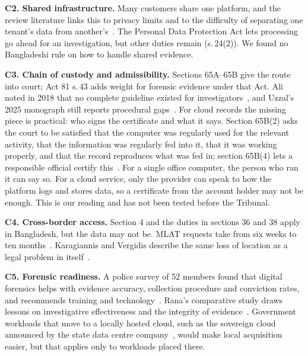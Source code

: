 \documentclass[conference]{IEEEtran}
\begin{document}
\textbf{C2. Shared infrastructure.} Many customers share one platform, and the review literature links this to privacy limits and to the difficulty of separating one tenant's data from another's~\cite{alshabibi,alenezi}. The Personal Data Protection Act lets processing go ahead for an investigation, but other duties remain (s.\,24(2)). We found no Bangladeshi rule on how to handle shared evidence.

\textbf{C3. Chain of custody and admissibility.} Sections 65A--65B give the route into court; Act 81 s.\,43 adds weight for forensic evidence under that Act. Ali noted in 2018 that no complete guideline existed for investigators~\cite{ali}, and Uzzal's 2025 monograph still reports procedural gaps~\cite{uzzal}. For cloud records the missing piece is practical: who signs the certificate and what it says. Section 65B(2) asks the court to be satisfied that the computer was regularly used for the relevant activity, that the information was regularly fed into it, that it was working properly, and that the record reproduces what was fed in; section 65B(4) lets a responsible official certify this~\cite{evidence}. For a single office computer, the person who ran it can say so. For a cloud service, only the provider can speak to how the platform logs and stores data, so a certificate from the account holder may not be enough. This is our reading and has not been tested before the Tribunal.

\textbf{C4. Cross-border access.} Section 4 and the duties in sections 36 and 38 apply in Bangladesh, but the data may not be. MLAT requests take from six weeks to ten months~\cite{akilal}. Karagiannis and Vergidis describe the same loss of location as a legal problem in itself~\cite{karagiannis}.

\textbf{C5. Forensic readiness.} A police survey of 52 members found that digital forensics helps with evidence accuracy, collection procedure and conviction rates, and recommends training and technology~\cite{sharmin}. Rana's comparative study draws lessons on investigative effectiveness and the integrity of evidence~\cite{rana}. Government workloads that move to a locally hosted cloud, such as the sovereign cloud announced by the state data centre company~\cite{oracle}, would make local acquisition easier, but that applies only to workloads placed there.
\end{document}
